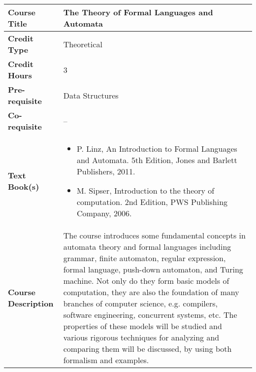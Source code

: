 \documentclass[11pt]{article}
\begin{document}
\begin{table}[h!]
\begin{tabular}{|l|l|}
\hline
\textbf{Course Title}       &   The Theory of Formal Languages and Automata\\ \hline
\textbf{Credit Type}        &  Theoretical \\ \hline
\textbf{Credit Hours}       & 3 \\ \hline
\textbf{Pre-requisite}       & Data Structures  \\ \hline
\textbf{Co-requisite}       & -- \\ \hline
\textbf{Text Book(s)}       & \begin{minipage}{.70\textwidth}
\begin{itemize} \itemsep-0.4em
	\vspace{3mm}
	\item P. Linz, An Introduction to Formal Languages and Automata. 5th Edition, Jones and Barlett Publishers, 2011.
	\item M. Sipser, Introduction to the theory of computation. 2nd Edition, PWS Publishing Company, 2006.
	\vspace{3mm}
\end{itemize}
\end{minipage}\\ \hline
\textbf{Course Description} & \begin{minipage}{.70\textwidth}
\vspace{3mm}
The course introduces some fundamental concepts in automata theory and formal
languages including grammar, finite automaton, regular expression, formal language, push-down automaton,
and Turing machine. Not only do they form basic models of computation, they are also the foundation of
many branches of computer science, e.g. compilers, software engineering, concurrent systems, etc. The
properties of these models will be studied and various rigorous techniques for analyzing and comparing
them will be discussed, by using both formalism and examples.
\vspace{3mm}
\end{minipage} \\ \hline
\end{tabular}
\end{table}
\end{document}
